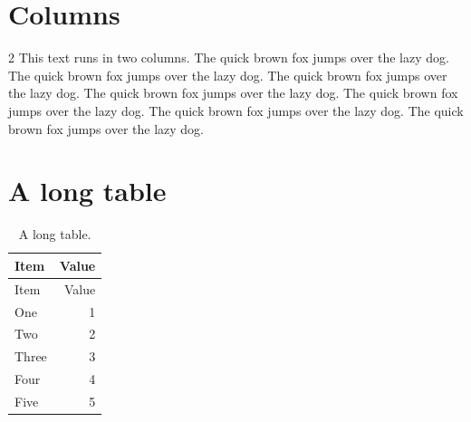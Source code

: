 \documentclass{article}
\begin{document}
\section{Columns}
\begin{multicols}{2}
This text runs in two columns. The quick brown fox jumps over the lazy
dog. The quick brown fox jumps over the lazy dog. The quick brown fox
jumps over the lazy dog. The quick brown fox jumps over the lazy dog.
The quick brown fox jumps over the lazy dog. The quick brown fox jumps
over the lazy dog. The quick brown fox jumps over the lazy dog.
\end{multicols}
\section{A long table}
\begin{longtable}{lr}
\caption{A long table.}\\
\hline
Item & Value\\
\hline
\endfirsthead
\hline
Item & Value\\
\hline
\endhead
\hline
\endfoot
One & 1\\
Two & 2\\
Three & 3\\
Four & 4\\
Five & 5\\
\end{longtable}
\end{document}
